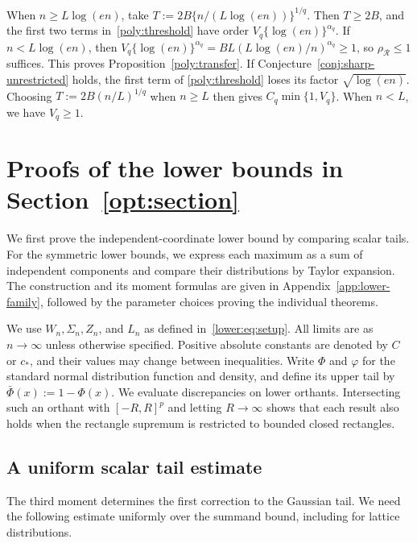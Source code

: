 \documentclass[11pt,letterpaper]{article}
\theoremstyle{remark}
\newcommand{\rh}{\rho_{\mathcal R}}
\begin{document}
When \(n\ge L\log(en)\), take \(T:=2B\{n/(L\log(en))\}^{1/q}\).
Then \(T\ge2B\), and the first two terms in~\eqref{poly:threshold}
have order \(V_q\{\log(en)\}^{\alpha_q}\). If \(n<L\log(en)\), then
\(V_q\{\log(en)\}^{\alpha_q}=BL(L\log(en)/n)^{\alpha_q}\ge1\), so \(\rh\le1\)
suffices. This proves Proposition~\ref{poly:transfer}. If
Conjecture~\ref{conj:sharp-unrestricted} holds, the first term of
\eqref{poly:threshold} loses its factor \(\sqrt{\log(en)}\).
Choosing \(T:=2B(n/L)^{1/q}\) when \(n\ge L\) then gives
\(C_q\min\{1,V_q\}\). When \(n<L\), we have \(V_q\ge1\).

\section{Proofs of the lower bounds in Section~\ref*{opt:section}}\label{app:sharpness-proofs}

We first prove the independent-coordinate lower bound by comparing
scalar tails. For the symmetric lower bounds, we express each maximum
as a sum of independent components and compare their distributions
by Taylor expansion. The construction and its moment formulas are
given in Appendix~\ref{app:lower-family}, followed by the parameter
choices proving the individual theorems.

We use \(W_n,\Sigma_n,Z_n\), and \(L_n\) as defined
in~\eqref{lower:eq:setup}. All limits are as \(n\to\infty\) unless
otherwise specified. Positive absolute constants are denoted by
\(C\) or \(c_*\), and their values may change between inequalities.
Write \(\Phi\) and \(\varphi\) for the standard normal distribution
function and density, and define its upper tail by
\(\bar\Phi(x):=1-\Phi(x)\).
We evaluate discrepancies on lower orthants. Intersecting such an
orthant with \([-R,R]^p\) and letting \(R\to\infty\) shows that each
result also holds when the rectangle supremum is restricted to bounded
closed rectangles.

\subsection{A uniform scalar tail estimate}
\label{app:moderate-tail-proof}
The third moment determines the first correction to the Gaussian
tail. We need the following estimate uniformly over the summand
bound, including for lattice distributions.
\end{document}
